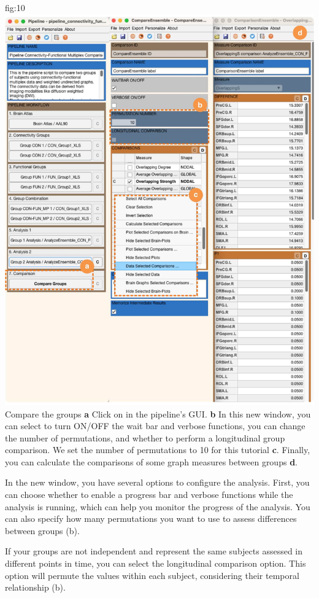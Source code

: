 \documentclass[justified]{tufte-handout}
\begin{document}
	{fig:10}
	{
	\includegraphics{fig10.jpg}
	}
	{Compare the groups}
	{
	{\bf a} Click on  in the pipeline's GUI.
	{\bf b} In this new window, you can select to turn ON/OFF the wait bar and verbose functions, you can change the number of permutations, and whether to perform a longitudinal group comparison. We set the number of permutations to 10 for this tutorial {\bf c}. Finally, you can calculate the comparisons of some graph measures between groups {\bf d}.
	}
	
In the new window, you have several options to configure the analysis. First, you can choose whether to enable a progress bar and verbose functions while the analysis is running, which can help you monitor the progress of the analysis. You can also specify how many permutations you want to use to assess differences between groups (b).

If your groups are not independent and represent the same subjects assessed in different points in time, you can select the longitudinal comparison option. This option will permute the values within each subject, considering their temporal relationship (b).
\end{document}
